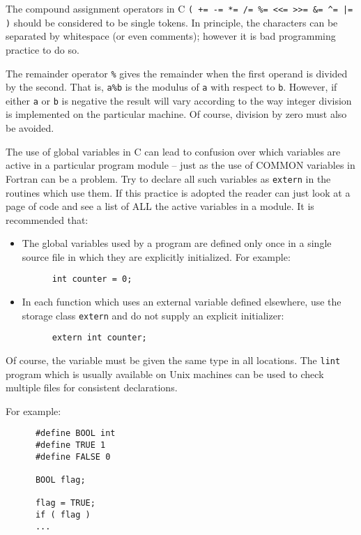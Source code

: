 The compound assignment operators in C 
\verb~( += -= *= /= %= <<= >>= &= ^= |= )~ 
should be considered to be single tokens. In principle, the characters can 
be separated by whitespace (or even comments); however it is bad programming 
practice to do so.

The remainder operator \verb~%~ gives the remainder when the first operand is
divided by the second. That is, {\tt a\%b} is the modulus of {\tt a} 
with respect to {\tt b}.
However, if either {\tt a} or {\tt b} is negative the result will vary according to the
way integer division is implemented on the particular machine.
Of course, division by zero must also be avoided.


The use of global variables in C can lead to confusion over which
variables are active in a particular program module --
just as the use of COMMON variables in Fortran can be a problem.
Try to declare  all such variables as {\tt extern} in the routines which 
use them.
If this practice is adopted the reader can just look at a page of code 
and see a list of ALL the active variables in a module.
It is recommended that:
\begin{itemize}
\item The global variables used by a program are defined only once 
in a single source file  in which they are explicitly initialized.
For example:
\begin{verbatim}
      int counter = 0;
\end{verbatim}
\item In each function which uses an external variable defined elsewhere,
 use the storage class {\tt extern} and do not supply
an explicit initializer:
\begin{verbatim}
      extern int counter;
\end{verbatim}
\end{itemize}
Of course, the variable must be given the same type in all 
locations.
The {\tt lint} program which is usually available on Unix machines can be 
used to check multiple files for consistent declarations.

For example:
\begin{verbatim}
      #define BOOL int
      #define TRUE 1
      #define FALSE 0

      BOOL flag;
  
      flag = TRUE;
      if ( flag )  
      ...
\end{verbatim}

